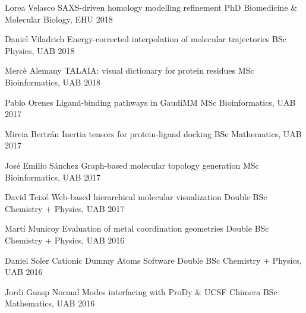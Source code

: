


\begin{cvhonors}



\cvhonor
    {Lorea Velasco}
    {SAXS-driven homology modelling refinement}
    {PhD Biomedicine \& Molecular Biology, EHU}
    {2018}

\cvhonor
    {Daniel Viladrich}
    {Energy-corrected interpolation of molecular trajectories}
    {BSc Physics, UAB}
    {2018}

\cvhonor
    {Mercè Alemany}
    {TALAIA: visual dictionary for protein residues}
    {MSc Bioinformatics, UAB}
    {2018}

\cvhonor
    {Pablo Orenes}
    {Ligand-binding pathways in GaudiMM}
    {MSc Bioinformatics, UAB}
    {2017}

\cvhonor
    {Mireia Bertrán}
    {Inertia tensors for protein-ligand docking}
    {BSc Mathematics, UAB}
    {2017}

\cvhonor
    {José Emilio Sánchez}
    {Graph-based molecular topology generation}
    {MSc Bioinformatics, UAB}
    {2017}

\cvhonor
    {David Teixé}
    {Web-based hierarchical molecular visualization}
    {Double BSc Chemistry + Physics, UAB}
    {2017}

\cvhonor
    {Martí Municoy}
    {Evaluation of metal coordination geometries}
    {Double BSc Chemistry + Physics, UAB}
    {2016}

\cvhonor
    {Daniel Soler}
    {Cationic Dummy Atoms Software}
    {Double BSc Chemistry + Physics, UAB}
    {2016}

  \cvhonor
    {Jordi Guasp} %
    {Normal Modes interfacing with ProDy \& UCSF Chimera} %
    {BSc Mathematics, UAB} %
    {2016} %
\end{cvhonors}
